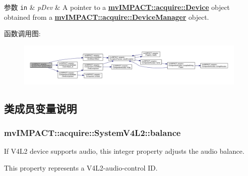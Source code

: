 \begin{DoxyParams}[1]{参数}
\mbox{\tt in}  & {\em p\+Dev} & A pointer to a {\bfseries \hyperlink{classmv_i_m_p_a_c_t_1_1acquire_1_1_device}{mv\+I\+M\+P\+A\+C\+T\+::acquire\+::\+Device}} object obtained from a {\bfseries \hyperlink{classmv_i_m_p_a_c_t_1_1acquire_1_1_device_manager}{mv\+I\+M\+P\+A\+C\+T\+::acquire\+::\+Device\+Manager}} object. \\
\hline
\end{DoxyParams}


函数调用图\+:
\nopagebreak
\begin{figure}[H]
\begin{center}
\leavevmode
\includegraphics[width=350pt]{classmv_i_m_p_a_c_t_1_1acquire_1_1_system_v4_l2_aea82e3241696f1ff8597fe83262acd6b_cgraph}
\end{center}
\end{figure}




\subsection{类成员变量说明}
\hypertarget{classmv_i_m_p_a_c_t_1_1acquire_1_1_system_v4_l2_adfb8953ab9f2bcddbdd422e870406647}{
\subsubsection[{balance}]{ mv\+I\+M\+P\+A\+C\+T\+::acquire\+::\+System\+V4\+L2\+::balance}}\label{classmv_i_m_p_a_c_t_1_1acquire_1_1_system_v4_l2_adfb8953ab9f2bcddbdd422e870406647}


If V4\+L2 device supports audio, this integer property adjusts the audio balance. 

This property represents a V4\+L2-\/audio-\/control I\+D.

